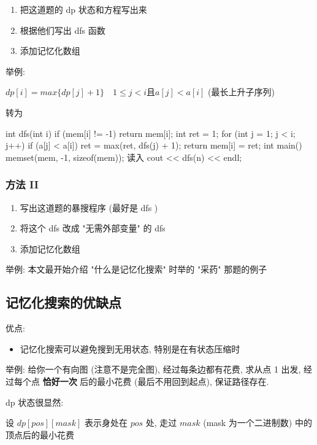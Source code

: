 \begin{enumerate}
\item 把这道题的 dp 状态和方程写出来
\item 根据他们写出 dfs 函数
\item 添加记忆化数组
\end{enumerate}

举例:

$dp[i] = max\{dp[j]+1\}\quad 1 \leq j < i \text{且}a[j]<a[i]$  (最长上升子序列)

转为

\begin{cppcode}
int dfs(int i) {
  if (mem[i] != -1) return mem[i];
  int ret = 1;
  for (int j = 1; j < i; j++)
    if (a[j] < a[i]) ret = max(ret, dfs(j) + 1);
  return mem[i] = ret;
}
int main() {
  memset(mem, -1, sizeof(mem));
  读入
  cout << dfs(n) << endl;
}
\end{cppcode}

\subsubsection{方法 II}

\begin{enumerate}
\item 写出这道题的暴搜程序 (最好是  dfs  )
\item 将这个 dfs 改成 "无需外部变量" 的 dfs
\item 添加记忆化数组
\end{enumerate}

举例: 本文最开始介绍 "什么是记忆化搜索" 时举的 "采药" 那题的例子

\hr

\subsection{记忆化搜索的优缺点}

优点:

\begin{itemize}
\item 记忆化搜索可以避免搜到无用状态, 特别是在有状态压缩时
\end{itemize}

举例: 给你一个有向图 (注意不是完全图), 经过每条边都有花费, 求从点 1 出发, 经过每个点 \textbf{ 恰好一次 } 后的最小花费 (最后不用回到起点), 保证路径存在.

dp 状态很显然:

设 $dp[pos][mask]$ 表示身处在 $pos$ 处, 走过 $mask$ (mask 为一个二进制数) 中的顶点后的最小花费

